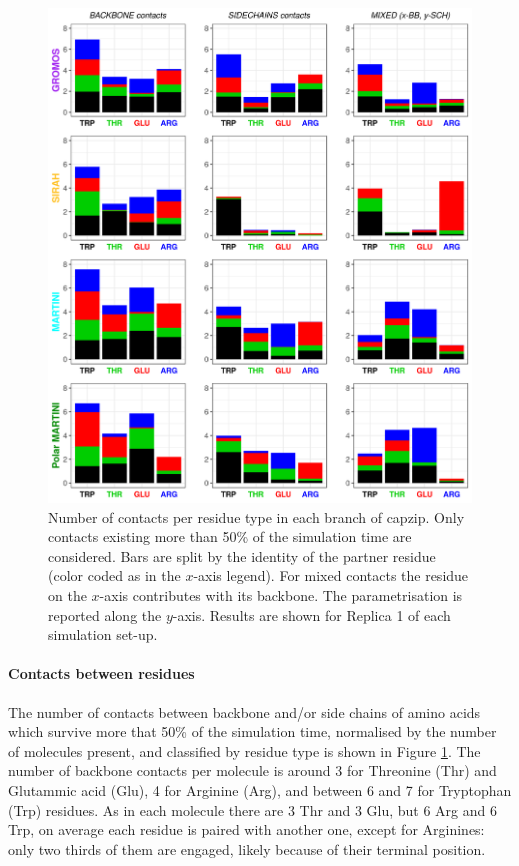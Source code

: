 \begin{figure}[p!]
\centering
\includegraphics[width=0.95\linewidth]{3results_capsule/pics/new_rep1_allFF.png}
\caption[Contacts between molecules during simulations of the buckyball]{Number of contacts per residue type in each branch of capzip. Only contacts existing more than 50\% of the simulation time are considered. Bars are split by the identity of the partner residue (color coded as in the $x$-axis legend). For mixed contacts the residue on the $x$-axis contributes with its backbone. The parametrisation is reported along the $y$-axis. Results are shown for Replica 1 of each simulation set-up.}
\label{fig:BTI_cont}
\end{figure}

\paragraph{Contacts between residues} The number of contacts between backbone and/or side chains of amino acids which survive more that 50\% of the simulation time, normalised by the number of molecules present, and classified by residue type is shown in Figure \ref{fig:BTI_cont}. 
%
The number of backbone contacts per molecule is around 3 for Threonine (Thr) and Glutammic acid (Glu), 4 for Arginine (Arg), and between 6 and 7 for Tryptophan (Trp) residues.
%
As in each molecule there are 3 Thr and 3 Glu, but 6 Arg and 6 Trp, on average each residue is paired with another one, except for Arginines: only two thirds of them are engaged, likely because of their terminal position.


